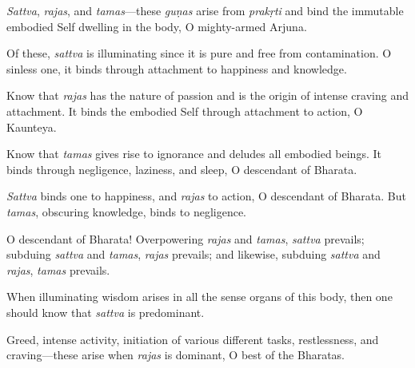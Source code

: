 {\textit{Sattva}, \textit{rajas}, and \textit{tamas}---these \textit{guṇas} arise from \textit{prakṛti} and bind the immutable embodied Self dwelling in the body, O mighty-armed Arjuna.}

{Of these, \textit{sattva} is illuminating since it is pure and free from contamination. O sinless one, it binds through attachment to happiness and knowledge.}

{Know that \textit{rajas} has the nature of passion and is the origin of intense craving and attachment. It binds the embodied Self through attachment to action, O Kaunteya.}

{Know that \textit{tamas} gives rise to ignorance and deludes all embodied beings. It binds through negligence, laziness, and sleep, O descendant of Bharata.}

{\textit{Sattva} binds one to happiness, and \textit{rajas} to action, O descendant of Bharata. But \textit{tamas}, obscuring knowledge, binds to negligence.}

{O descendant of Bharata! Overpowering \textit{rajas} and \textit{tamas}, \textit{sattva} prevails; subduing \textit{sattva} and \textit{tamas}, \textit{rajas} prevails; and likewise, subduing \textit{sattva} and \textit{rajas}, \textit{tamas} prevails.}

{When illuminating wisdom arises in all the sense organs of this body, then one should know that \textit{sattva} is predominant.}

{Greed, intense activity, initiation of various different tasks, restlessness, and craving---these arise when \textit{rajas} is dominant, O best of the Bharatas.}

